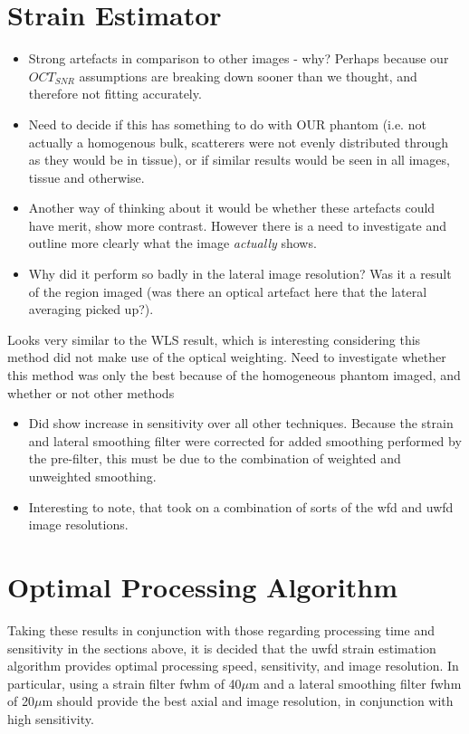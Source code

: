 \section{Strain Estimator}



\begin{itemize}
	\item Strong artefacts in comparison to other images - why? Perhaps because our $OCT_{SNR}$ assumptions are breaking down sooner than we thought, and therefore not fitting accurately.
	\item Need to decide if this has something to do with OUR phantom (i.e. not actually a homogenous bulk, scatterers were not evenly distributed through as they would be in tissue), or if similar results would be seen in all images, tissue and otherwise.
	\item Another way of thinking about it would be whether these artefacts could have merit, show more contrast. However there is a need to investigate and outline more clearly what the image \textit{actually} shows. 
	\item Why did it perform so badly in the lateral image resolution? Was it a result of the region imaged (was there an optical artefact here that the lateral averaging picked up?).
\end{itemize}

Looks very similar to the WLS result, which is interesting considering this method did not make use of the optical weighting. Need to investigate whether this method was only the best because of the homogeneous phantom imaged, and whether or not other methods 

\begin{itemize}
	\item Did show increase in sensitivity over all other techniques. Because the strain and lateral smoothing filter were corrected for added smoothing performed by the pre-filter, this must be due to the combination of weighted and unweighted smoothing.
 	\item Interesting to note, that took on a combination of sorts of the \ac{wfd} and \ac{uwfd} image resolutions. 
\end{itemize}

\section{Optimal Processing Algorithm}

Taking these results in conjunction with those regarding processing time and sensitivity in the sections above, it is decided that the \ac{uwfd} strain estimation algorithm provides optimal processing speed, sensitivity, and image resolution. In particular, using a strain filter \ac{fwhm} of 40$\mu$m and a lateral smoothing filter \ac{fwhm} of 20$\mu$m should provide the best axial and image resolution, in conjunction with high sensitivity. 

